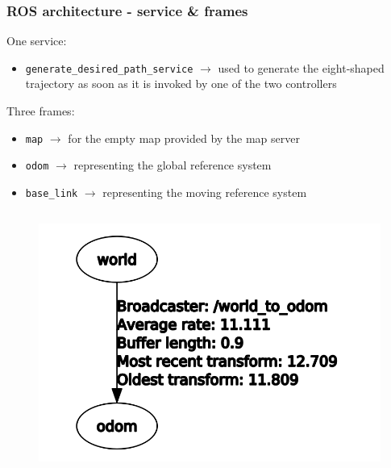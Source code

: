 \documentclass{beamer}
\begin{document}

\begin{frame}[allowframebreaks]
\frametitle{ROS architecture - service \& frames}

One service:
\begin{itemize}
  \item \texttt{generate\_desired\_path\_service} $\rightarrow$ used to generate the eight-shaped trajectory as soon as it is invoked by one of the two controllers
\end{itemize}

\vspace{2em}

Three frames:
\begin{itemize}
  \item \texttt{map} $\rightarrow$ for the empty map provided by the map server
  \item \texttt{odom} $\rightarrow$ representing the global reference system
  \item \texttt{base\_link} $\rightarrow$ representing the moving reference system
\end{itemize}

\framebreak

\begin{columns}


\begin{figure}[H]
    \centering
    \includegraphics[scale=0.26]{img/ros_tools/rqttftree_custom.png}
\end{figure}



\end{columns}
\end{frame}
\end{document}
